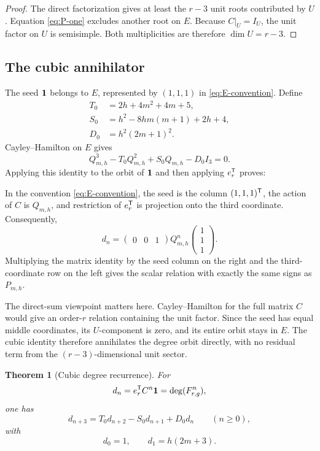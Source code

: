 \documentclass[11pt]{article}
\newtheorem{theorem}{Theorem}[section]
\theoremstyle{remark}
\numberwithin{equation}{section}
\begin{document}
\begin{proof}
The direct factorization gives at least the \(r-3\) unit roots contributed
by \(U\).  Equation \eqref{eq:P-one} excludes another root on \(E\).
Because \(C|_U=I_U\), the unit factor on \(U\) is semisimple.  Both
multiplicities are therefore \(\dim U=r-3\).
\end{proof}

\subsection{The cubic annihilator}

The seed \(\mathbf{1}\) belongs to \(E\), represented by \((1,1,1)\) in
\eqref{eq:E-convention}.  Define
\begin{equation}\label{eq:TSD}
\begin{aligned}
T_0&=2h+4m^2+4m+5,\\
S_0&=h^2-8hm(m+1)+2h+4,\\
D_0&=h^2(2m+1)^2.
\end{aligned}
\end{equation}
Cayley--Hamilton on \(E\) gives
\[
Q_{m,h}^3-T_0Q_{m,h}^2+S_0Q_{m,h}-D_0I_3=0.
\]
Applying this identity to the orbit of \(\mathbf{1}\) and then applying
\(e_r^{\mathsf{T}}\) proves:

In the convention \eqref{eq:E-convention}, the seed is the column
\((1,1,1)^{\mathsf{T}}\), the action of \(C\) is \(Q_{m,h}\), and
restriction of \(e_r^{\mathsf{T}}\) is projection onto the third
coordinate.  Consequently,
\[
d_n
=
\begin{pmatrix}0&0&1\end{pmatrix}
Q_{m,h}^n
\begin{pmatrix}1\\1\\1\end{pmatrix}.
\]
Multiplying the matrix identity by the seed column on the right and the
third-coordinate row on the left gives the scalar relation with exactly the
same signs as \(P_{m,h}\).

The direct-sum viewpoint matters here.  Cayley--Hamilton for the full matrix
\(C\) would give an order-\(r\) relation containing the unit factor.  Since
the seed has equal middle coordinates, its \(U\)-component is zero, and its
entire orbit stays in \(E\).  The cubic identity therefore annihilates the
degree orbit directly, with no residual term from the \((r-3)\)-dimensional
unit sector.

\begin{theorem}[Cubic degree recurrence]\label{thm:cubic-recurrence}
For
\[
d_n=e_r^{\mathsf{T}}C^n\mathbf{1}=\operatorname{deg}(F_{r,g}^n),
\]
one has
\begin{equation}\label{eq:scalar-recurrence}
d_{n+3}=T_0d_{n+2}-S_0d_{n+1}+D_0d_n
\qquad(n\geq0),
\end{equation}
with
\begin{equation}\label{eq:d0-d1}
d_0=1,\qquad d_1=h(2m+3).
\end{equation}
\end{theorem}
\end{document}
